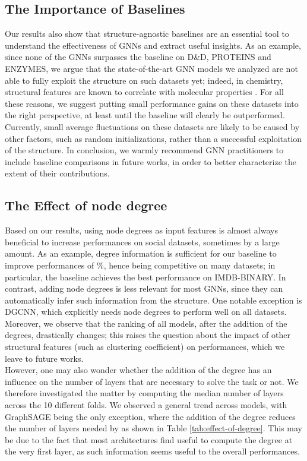 \documentclass{article}
\begin{document}
\subsection{The Importance of Baselines}
Our results also show that structure-agnostic baselines are an essential tool to understand the effectiveness of GNNs and extract useful insights. As an example, since none of the GNNs surpasses the baseline on D\&D, PROTEINS and ENZYMES, we argue that the state-of-the-art GNN models we analyzed are not able to fully exploit the structure on such datasets yet; indeed, in chemistry, structural features are known to correlate with molecular properties \citep{chemical-structure-is-important}. For all these reasons, we suggest putting small performance gains on these datasets into the right perspective, at least until the baseline will clearly be outperformed. Currently, small average fluctuations on these datasets are likely to be caused by other factors, such as random initializations, rather than a successful exploitation of the structure. In conclusion, we warmly recommend GNN practitioners to include baseline comparisons in future works, in order to better characterize the extent of their contributions.

\subsection{The Effect of node degree}
Based on our results, using node degrees as input features is almost always beneficial to increase performances on social datasets, sometimes by a large amount. As an example, degree information is sufficient for our baseline to improve performances of \%, hence being competitive on many datasets; in particular, the baseline achieves the best performance on IMDB-BINARY. In contrast, adding node degrees is less relevant for most GNNs, since they can automatically infer such information from the structure. One notable exception is DGCNN, which explicitly needs node degrees to perform well on all datasets. Moreover, we observe that the ranking of all models, after the addition of the degrees, drastically changes; this raises the question about the impact of other structural features (such as clustering coefficient) on performances, which we leave to future works. \\ However, one may also wonder whether the addition of the degree has an influence on the number of layers that are necessary to solve the task or not. We therefore investigated the matter by computing the median number of layers across the 10 different folds. We observed a general trend across models, with GraphSAGE being the only exception, where the addition of the degree reduces the number of layers needed by  as shown in Table \ref{tab:effect-of-degree}. This may be due to the fact that most architectures find useful to compute the degree at the very first layer, as such information seems useful to the overall performances.
\end{document}
